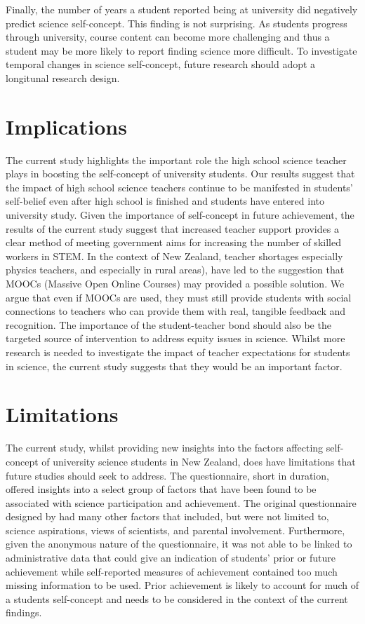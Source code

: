 Finally, the number of years a student reported being at university did negatively predict science self-concept. This finding is not surprising. As students progress through university, course content can become more challenging and thus a student may be more likely to report finding science more difficult. To investigate temporal changes in science self-concept, future research should adopt a longitunal research design. 

\section*{Implications}
The current study highlights the important role the high school science teacher plays in boosting the self-concept of university students. Our results suggest that the impact of high school science teachers continue to be manifested in students' self-belief even after high school is finished and students have entered into university study. Given the importance of self-concept in future achievement, the results of the current study suggest that increased teacher support provides a clear method of meeting government aims for increasing the number of skilled workers in STEM. In the context of New Zealand, teacher shortages especially physics teachers, and especially in rural areas), have led to the suggestion that MOOCs (Massive Open Online Courses) may provided a possible solution. We argue that even if MOOCs are used, they must still provide students with social connections to teachers who can provide them with real, tangible feedback and recognition. The importance of the student-teacher bond should also be the targeted source of intervention to address equity issues in science. Whilst more research is needed to investigate the impact of teacher expectations for students in science, the current study suggests that they would be an important factor.


\section*{Limitations}
The current study, whilst providing new insights into the factors affecting self-concept of university science students in New Zealand, does have limitations that future studies should seek to address. The questionnaire, short in duration, offered insights into a select group of factors that have been found to be associated with science participation and achievement. The original questionnaire designed by \cite{dewitt2011high} had many other factors that included, but were not limited to, science aspirations, views of scientists, and parental involvement. Furthermore, given the anonymous nature of the questionnaire, it was not able to be linked to administrative data that could give an indication of students' prior or future achievement while self-reported measures of achievement contained too much missing information to be used. Prior achievement is likely to account for much of a students self-concept and needs to be considered in the context of the current findings.

